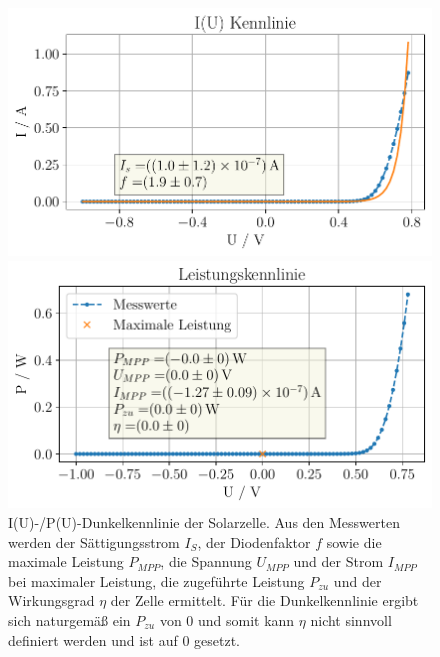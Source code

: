 \documentclass[english, ngerman]{scrartcl}
\begin{document}
\begin{figure}[H]
    \centering
    \begin{minipage}[t]{0.485\linewidth}
        \centering
        \includegraphics[width=\linewidth]{fig/plots/dunkel_UI.pdf}
    \end{minipage}%
    \hspace*{\fill}
    \begin{minipage}[t]{0.485\linewidth}
        \centering
        \includegraphics[width=\linewidth]{fig/plots/dunkel_P.pdf}
    \end{minipage}
    \caption[I(U)-/P(U)-Dunkelkennlinie Solarzelle -- Sonnensimulator]{I(U)-/P(U)-Dunkelkennlinie der Solarzelle. Aus den Messwerten werden der Sättigungsstrom $I_S$, der Diodenfaktor $f$ sowie die maximale Leistung $P_{MPP}$, die Spannung $U_{MPP}$ und der Strom $I_{MPP}$ bei maximaler Leistung, die zugeführte Leistung $P_{zu}$ und der Wirkungsgrad $\eta$ der Zelle ermittelt. Für die Dunkelkennlinie ergibt sich naturgemäß ein $P_{zu}$ von 0 und somit kann $\eta$ nicht sinnvoll definiert werden und ist auf 0 gesetzt.}
    \label{fig:solar_dunkel}
\end{figure}
\setcaphanging
\end{document}
